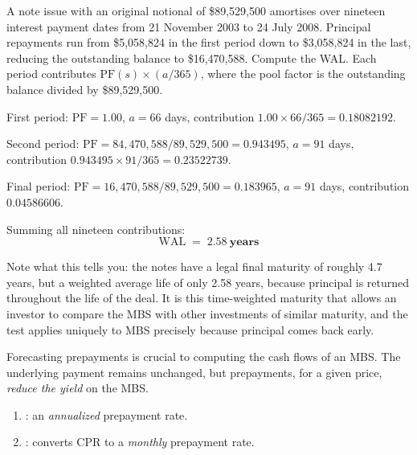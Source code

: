 \begin{crexbox}
A note issue with an original notional of \$89,529,500 amortises over nineteen
interest payment dates from 21 November 2003 to 24 July 2008. Principal repayments
run from \$5,058,824 in the first period down to \$3,058,824 in the last,
reducing the outstanding balance to \$16,470,588. Compute the WAL.
\tcblower
Each period contributes $\mathrm{PF}(s) \times (a/365)$, where the pool factor is
the outstanding balance divided by \$89,529,500.

\smallskip
First period: $\mathrm{PF} = 1.00$, $a = 66$ days, contribution
$1.00 \times 66/365 = 0.18082192$.

Second period: $\mathrm{PF} = 84{,}470{,}588/89{,}529{,}500 = 0.943495$,
$a = 91$ days, contribution $0.943495 \times 91/365 = 0.23522739$.

Final period: $\mathrm{PF} = 16{,}470{,}588/89{,}529{,}500 = 0.183965$,
$a = 91$ days, contribution $0.04586606$.

\smallskip
Summing all nineteen contributions:
\[ \mathrm{WAL} \;=\; \mathbf{2.58\ \text{years}} \]

\smallskip
Note what this tells you: the notes have a legal final maturity of roughly 4.7
years, but a weighted average life of only 2.58 years, because principal is
returned throughout the life of the deal. It is this time-weighted maturity that
allows an investor to compare the MBS with other investments of similar maturity,
and the test applies uniquely to MBS precisely because principal comes back early.
\end{crexbox}


Forecasting prepayments is crucial to computing the cash flows of an MBS. The
underlying payment remains unchanged, but prepayments, for a given price,
\emph{reduce the yield} on the MBS.

\begin{enumerate}
\item {}: an
\emph{annualized} prepayment rate.
\item {}: converts CPR to a
\emph{monthly} prepayment rate.
\end{enumerate}

